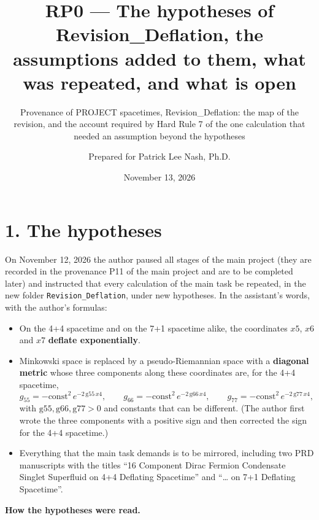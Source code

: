 \documentclass[
  10pt,
]{article}
\title{RP0 --- The hypotheses of Revision\_Deflation, the assumptions
added to them, what was repeated, and what is open}
\subtitle{Provenance of PROJECT spacetimes, Revision\_Deflation: the map
of the revision, and the account required by Hard Rule 7 of the one
calculation that needed an assumption beyond the hypotheses}
\author{Prepared for Patrick Lee Nash, Ph.D.}
\date{November 13, 2026}
\providecommand{\tightlist}{%
  \setlength{\itemsep}{0pt}\setlength{\parskip}{0pt}}
\begin{document}
\maketitle

\hypertarget{the-hypotheses}{%
\section{1. The hypotheses}\label{the-hypotheses}}

On November 12, 2026 the author paused all stages of the main project
(they are recorded in the provenance P11 of the main project and are to
be completed later) and instructed that every calculation of the main
task be repeated, in the new folder \texttt{Revision\_Deflation}, under
new hypotheses. In the assistant's words, with the author's formulas:

\begin{itemize}
\tightlist
\item
  On the 4+4 spacetime and on the 7+1 spacetime alike, the coordinates
  \(x5\), \(x6\) and \(x7\) \textbf{deflate exponentially}.
\item
  Minkowski space is replaced by a pseudo-Riemannian space with a
  \textbf{diagonal metric} whose three components along these
  coordinates are, for the 4+4 spacetime,
  \[g_{55}=-\mathrm{const}^2\,e^{-2\,\mathrm{g55}\,x4},\qquad
  g_{66}=-\mathrm{const}^2\,e^{-2\,\mathrm{g66}\,x4},\qquad
  g_{77}=-\mathrm{const}^2\,e^{-2\,\mathrm{g77}\,x4},\] with
  \(\mathrm{g55},\mathrm{g66},\mathrm{g77}>0\) and constants that can be
  different. (The author first wrote the three components with a
  positive sign and then corrected the sign for the 4+4 spacetime.)
\item
  Everything that the main task demands is to be mirrored, including two
  PRD manuscripts with the titles ``16 Component Dirac Fermion
  Condensate Singlet Superfluid on 4+4 Deflating Spacetime'' and
  ``\ldots{} on 7+1 Deflating Spacetime''.
\end{itemize}

\textbf{How the hypotheses were read.}
\end{document}
